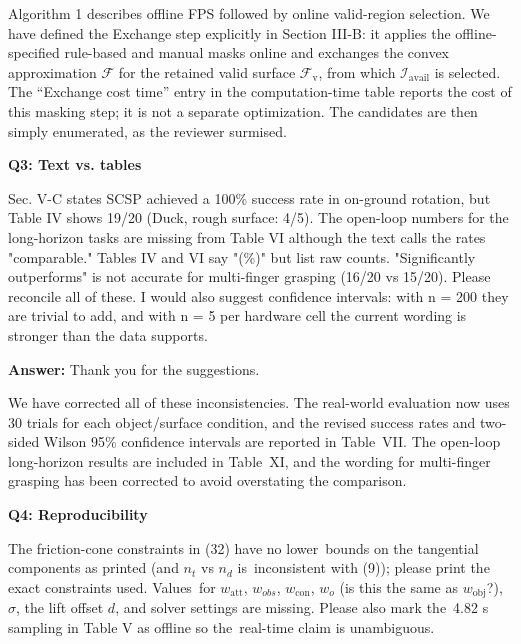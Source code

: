 \documentclass[journal,10pt]{IEEEtran}
\newcommand{\question}[2]{\par\smallskip\noindent
 \color{responseblue}\textbf{Q#1: #2}\par\nobreak\noindent\color{responseblue}}
\newcommand{\answer}{\par\smallskip\noindent\color{black}\textbf{Answer: }\ignorespaces
}
\begin{document}
  Algorithm 1 describes offline FPS followed by online valid-region selection. We have defined the Exchange step explicitly in Section III-B: it applies the offline-specified rule-based and manual masks online and exchanges the convex approximation $\mathcal{F}$ for the retained valid surface $\mathcal{F}_{\mathrm{v}}$, from which $\mathcal{I}_{\mathrm{avail}}$ is selected. The ``Exchange cost time'' entry in the computation-time table reports the cost of this masking step; it is not a separate optimization. The candidates are then simply enumerated, as the reviewer surmised.

\question{3}{Text vs. tables}
Sec. V-C states SCSP achieved a 100\% success rate in
on-ground rotation, but Table IV shows 19/20 (Duck, rough surface:
4/5). The open-loop numbers for the long-horizon tasks are missing from
Table VI although the text calls the rates "comparable." Tables IV and
VI say "(\%)" but list raw counts. "Significantly outperforms" is not
accurate for multi-finger grasping (16/20 vs 15/20). Please reconcile
all of these. I would also suggest confidence intervals: with n = 200
they are trivial to add, and with n = 5 per hardware cell the current
wording is stronger than the data supports.

\answer Thank you for the suggestions.

We have corrected all of these inconsistencies. The real-world evaluation now uses 30 trials for each object/surface condition, and the revised success rates and two-sided Wilson 95\% confidence intervals are reported in Table~VII. The open-loop long-horizon results are included in Table~XI, and the wording for multi-finger grasping has been corrected to avoid overstating the comparison.

\question{4}{Reproducibility}
The friction-cone constraints in (32) have no lower\
bounds on the tangential components as printed (and $n_t$ vs $n_d$ is\
inconsistent with (9)); please print the exact constraints used. Values\
for $w_{\text{att}}$, $w_{obs}$, $w_{\text{con}}$, $w_o$ (is this the same as $w_{\text{obj}}$?), $\sigma$, the
lift offset $d$, and solver settings are missing. Please also mark the\
4.82 s sampling in Table V as offline so the\
real-time claim is unambiguous.
\end{document}
